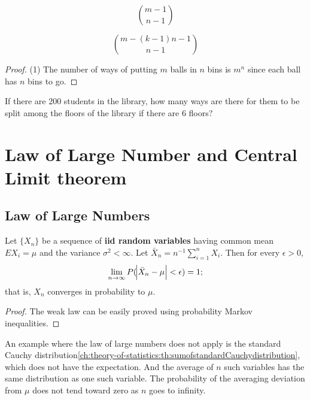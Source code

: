 \begin{refsection}
\begin{lemma}
\begin{itemize}
\end{itemize}	
	
	
	
	$$\binom{m-1}{n-1}$$
	
	$$\binom{m-(k-1)n-1}{n-1}$$
	
\end{lemma}
\begin{proof}
(1)	
The number of ways of putting $m$ balls in $n$ bins is $m^n$ since each ball has $n$ bins to go.	
\end{proof}

\begin{example}
 If there are 200 students in the library, how many ways are there for them to be split among the floors of the library if there are 6 floors?	
 
 
\end{example}


\section{Law of Large Number and Central Limit theorem}
\subsection{Law of Large Numbers}
\begin{theorem}\label{ch:theory-of-probability:th:weaklawlargenumber}
\cite[232]{casella2002statistical}Let $\{X_n\}$ be a sequence of \textbf{iid random variables} having common mean $EX_i = \mu$ and the variance $\sigma^2 < \infty$. Let $\bar{X}_n = n^{-1}\sum_{i=1}^n X_i$. Then for every $\epsilon > 0$,
$$\lim_{n\to \infty} P(\abs{\bar{X}_n - \mu} < \epsilon) = 1;$$
that is, $X_n$ converges in probability to $\mu$. 
\end{theorem}
\begin{proof}
 The weak law can be easily proved using probability Markov inequalities.
\end{proof}

\begin{remark}
An example where the law of large numbers does not apply is the standard Cauchy distribution\autoref{ch:theory-of-statistics:th:sumofstandardCauchydistribution}, which does not have the expectation. And the average of $n$ such variables has the same distribution as one such variable. The probability of the averaging deviation from $\mu$ does not tend toward zero as $n$ goes to infinity.	
\end{remark}



\end{refsection}
